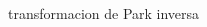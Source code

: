 \documentclass[a4paper, 10pt, onecolumn,journal]{ieeeconf}
\begin{document}
\begin{figure}[thpb]
    \centering
    \begin{adjustbox}{max width=\columnwidth}
    \end{adjustbox}
    \caption{transformacion de Park inversa}
    \label{transformacion de Park inversa}
\end{figure}


\newpage
\end{document}
